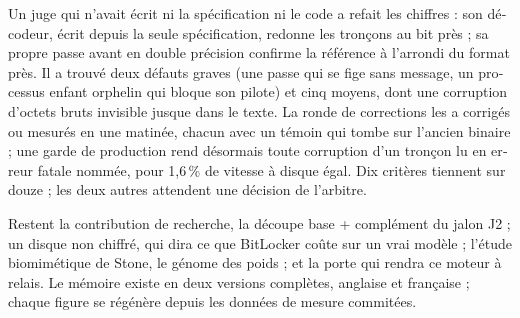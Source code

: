 \begin{otherlanguage}{french}
Un juge qui n'avait écrit ni la spécification ni le code a refait les chiffres : son décodeur, écrit depuis la seule spécification, redonne les tronçons au bit près ; sa propre passe avant en double précision confirme la référence à l'arrondi du format près. Il a trouvé deux défauts graves (une passe qui se fige sans message, un processus enfant orphelin qui bloque son pilote) et cinq moyens, dont une corruption d'octets bruts invisible jusque dans le texte. La ronde de corrections les a corrigés ou mesurés en une matinée, chacun avec un témoin qui tombe sur l'ancien binaire ; une garde de production rend désormais toute corruption d'un tronçon lu en erreur fatale nommée, pour 1,6\,\% de vitesse à disque égal. Dix critères tiennent sur douze ; les deux autres attendent une décision de l'arbitre.

Restent la contribution de recherche, la découpe base + complément du jalon J2 ; un disque non chiffré, qui dira ce que BitLocker coûte sur un vrai modèle ; l'étude biomimétique de Stone, le génome des poids ; et la porte qui rendra ce moteur à relais. Le mémoire existe en deux versions complètes, anglaise et française ; chaque figure se régénère depuis les données de mesure commitées.
\end{otherlanguage}
